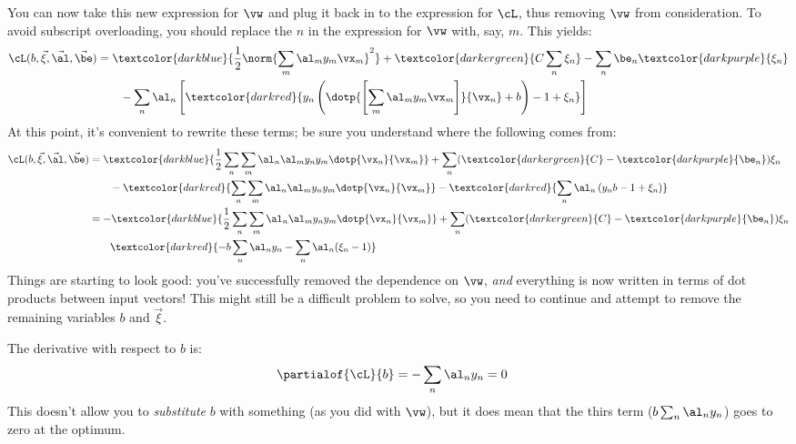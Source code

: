 You can now take this new expression for $\vw$ and plug it back in to
the expression for $\cL$, thus removing $\vw$ from consideration.  To
avoid subscript overloading, you should replace the $n$ in the
expression for $\vw$ with, say, $m$.  This yields:
%
\begin{align}
\cL(b,\vec\xi,\vec\al,\vec\be)
&=
  \textcolor{darkblue}{\frac 1 2 \norm{\sum_m \al_m y_m \vx_m}^2}
+ \textcolor{darkergreen}{C \sum_n \xi_n}
- \sum_n \be_n \textcolor{darkpurple}{\xi_n}
\\&\qquad
- \sum_n \al_n \left[
    \textcolor{darkred}{y_n \left( \dotp{\left[ \sum_m \al_m y_m \vx_m\right]}{\vx_n} + b \right) - 1 + \xi_n}
  \right]
\end{align}
%
At this point, it's convenient to rewrite these terms; be sure you
understand where the following comes from:
%
\begin{align}
\cL(b,\vec\xi,\vec\al,\vec\be)
&=
  \textcolor{darkblue}{\frac 1 2
    \sum_n \sum_m \al_n \al_m y_n y_m \dotp{\vx_n}{\vx_m}
  }
+ \sum_n (\textcolor{darkergreen}{C} - \textcolor{darkpurple}{\be_n}) \xi_n
\\&\qquad
   - \textcolor{darkred}{
    \sum_n
    \sum_m
      \al_n \al_m y_n y_m \dotp{\vx_n}{\vx_m}
}
- \textcolor{darkred}{
  \sum_n \al_n \left( y_n b - 1 + \xi_n \right)}\\
&=
-   \textcolor{darkblue}{\frac 1 2
    \sum_n \sum_m \al_n \al_m y_n y_m \dotp{\vx_n}{\vx_m}
  }
+ \sum_n (\textcolor{darkergreen}{C} - \textcolor{darkpurple}{\be_n}) \xi_n
\\&\qquad
\textcolor{darkred}{
-  b \sum_n \al_n y_n
-  \sum_n \al_n (\xi_n - 1)}
\end{align}
%
Things are starting to look good: you've successfully removed the
dependence on $\vw$, \emph{and} everything is now written in terms of
dot products between input vectors!  This might still be a difficult
problem to solve, so you need to continue and attempt to remove the
remaining variables $b$ and $\vec \xi$.

The derivative with respect to $b$ is:
%
\begin{align}
\partialof{\cL}{b}
&= - \sum_n \al_n y_n = 0
\end{align}
%
This doesn't allow you to \emph{substitute} $b$ with something (as you
did with $\vw$), but it does mean that the thirs term ($b \sum_n
\al_n y_n$) goes to zero at the optimum.

